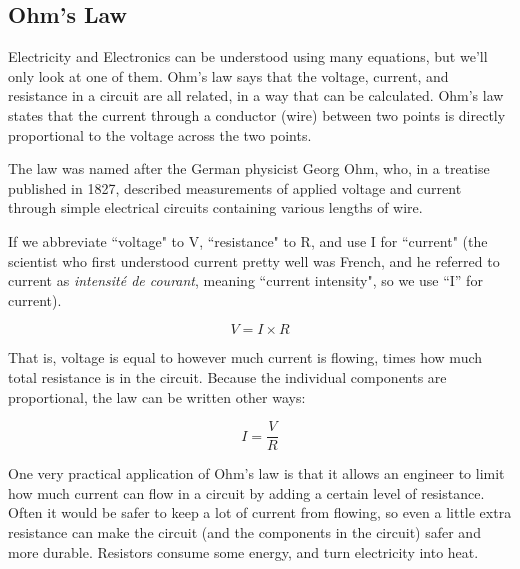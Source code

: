\subsection*{Ohm's Law}

Electricity and Electronics can be understood using many equations, but we'll only look at one of them. Ohm's law says that the voltage, current, and resistance in a circuit are all related, in a way that can be calculated. Ohm's law states that the current through a conductor (wire) between two points is directly proportional to the voltage across the two points.

The law was named after the German physicist Georg Ohm, who, in a treatise published in 1827, described measurements of applied voltage and current through simple electrical circuits containing various lengths of wire.

If we abbreviate ``voltage" to V, ``resistance" to R, and use I for ``current" (the scientist who first understood current pretty well was French, and he referred to current as \emph{intensit{\'e} de courant}, meaning ``current intensity", so we use ``I'' for current). 

\begin{equation}
V = I \times R
\end{equation}


That is, voltage is equal to however much current is flowing, times how much total resistance is in the circuit. Because the individual components are proportional, the law can be written other ways:

\begin{equation}
I =  \frac{V}{R}
\end{equation}

One very practical application of Ohm's law is that it allows an engineer to limit how much current can flow in a circuit by adding a certain level of resistance. Often it would be safer to keep a lot of current from flowing, so even a little extra resistance can make the circuit (and the components in the circuit) safer and more durable. Resistors consume some energy, and turn electricity into heat.



